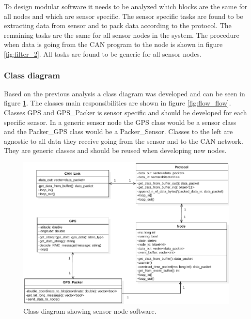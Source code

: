 To design modular software it needs to be analyzed which blocks are the same for all nodes and which are sensor specific.
The sensor specific tasks are found to be extracting data from sensor and to pack data according to the protocol.
The remaining tasks are the same for all sensor nodes in the system. 
The procedure when data is going from the CAN program to the node is shown in figure \ref{fig:filter_2}.
All tasks are found to be generic for all sensor nodes.

\subsubsection*{Class diagram}
Based on the previous analysis a class diagram was developed and can be seen in figure \ref{fig:node_class_diagram}.
The classes main responsibilities are shown in figure \ref{fig:flow_flow}.
Classes GPS and GPS\_Packer is sensor specific and should be developed for each specific sensor.
In a generic sensor node the GPS class would be a sensor class and the Packer\_GPS class would be a Packer\_Sensor. 
Classes to the left are agnostic to all data they receive going from the sensor and to the CAN network.
They are generic classes and should be reused when developing new nodes.

\begin{figure}[!h]
\centering
\includegraphics[width=1\textwidth]{graphics/ClassDiagram_NodeSimple}
\caption{Class diagram showing sensor node software.}
\label{fig:node_class_diagram}
\end{figure}


